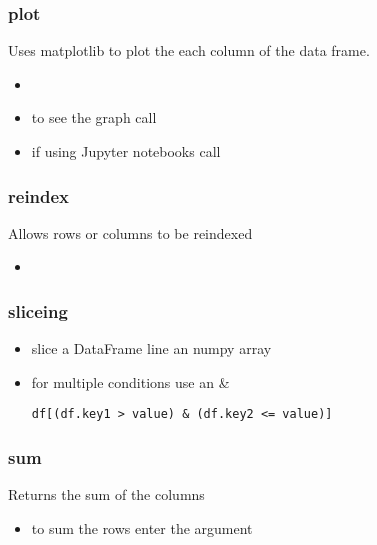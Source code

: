 %
\subsubsection{plot}
Uses matplotlib to plot the each column of the data frame.
  \begin{itemize}

    \item {\color{red}{make sure to import matplotlib before calling this
      method}}

    \item to see the graph call {\color{red}{plt.show()}}

    \item if using Jupyter notebooks call {\color{red}{\%matplotlib inline}}
  \end{itemize}

%
\subsubsection{reindex}
Allows rows or columns to be reindexed
  \begin{itemize}

    \item \color{red}{if no arguments are passed the rows will be reindexed,
      and if the columns argument is passed the columns will be reindexed.}
  \end{itemize}

%
\subsubsection{sliceing}
\begin{itemize}
  \item slice a DataFrame line an numpy array
  \item for multiple conditions use an \&
\begin{lstlisting}
df[(df.key1 > value) & (df.key2 <= value)]
\end{lstlisting}
\end{itemize}
%
\subsubsection{sum}
Returns the sum of the columns
  \begin{itemize}

    \item to sum the rows enter the argument \color{red}{axis=1}
  \end{itemize}

